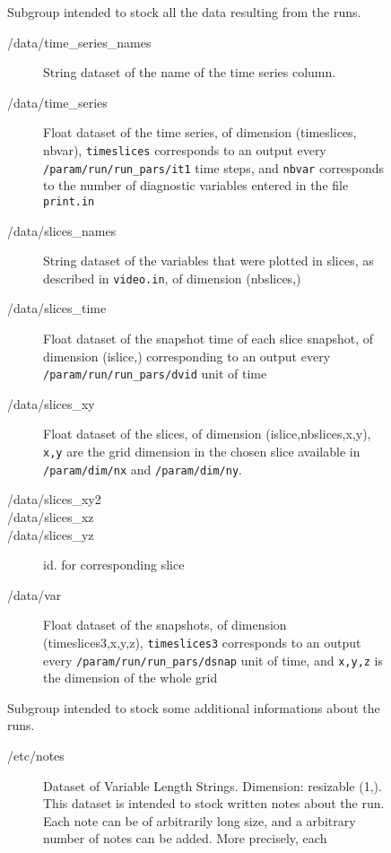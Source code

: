 \documentclass[a4paper,12pt]{article}
\begin{document}
\begin{figure}[p]
{\begin{description}
\begin{description}
\begin{description}
    \end{description}
  \item[/data/] Subgroup intended to stock all the data resulting from
    the runs.
    \begin{description}
    \item[/data/time\_series\_names] String dataset of the name of the
      time series column.
    \item[/data/time\_series] Float dataset of the time series, of
      dimension (timeslices, nbvar),  \texttt{timeslices} corresponds
      to an output every \texttt{/param/run/run\_pars/it1} time
      steps, and \texttt{nbvar} corresponds to the number of
      diagnostic variables entered in the file \texttt{print.in}
      \item[/data/slices\_names] String dataset of the variables that
        were plotted in slices, as described in \texttt{video.in}, of
        dimension (nbslices,)
      \item[/data/slices\_time] Float dataset of the snapshot time of each
        slice snapshot, of dimension (islice,)  corresponding to an output
        every \texttt{/param/run/run\_pars/dvid} unit of time
      \item[/data/slices\_xy] Float dataset of the slices, of dimension
        (islice,nbslices,x,y),  \texttt{x,y} are the grid dimension in the chosen slice
        available in \texttt{/param/dim/nx} and \texttt{/param/dim/ny}.
      \item[/data/slices\_xy2] 
      \item[/data/slices\_xz]
      \item[/data/slices\_yz] id. for corresponding slice
    \item[/data/var] Float dataset of the snapshots, of dimension
      (timeslices3,x,y,z), \texttt{timeslices3} corresponds to an
      output every  \texttt{/param/run/run\_pars/dsnap} unit of time,
      and \texttt{x,y,z} is the dimension of the whole grid
    \end{description}
  \item[/etc/] Subgroup intended to stock some additional
    informations about the runs.
    \begin{description}
    \item[/etc/notes] Dataset of Variable Length Strings. Dimension:
      resizable (1,). This dataset is intended to stock written notes
      about the run. Each note can be of arbitrarily long size, and a
      arbitrary number of notes can be added. More precisely, each

\end{description}
\end{description}
\end{description}}
\end{figure}
\end{document}
